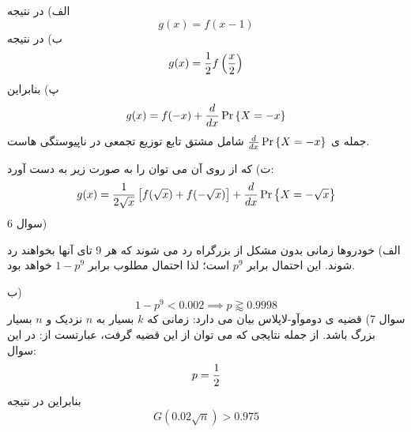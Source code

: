\documentclass[10pt,letterpaper]{article}
\begin{document}
الف)
در نتیجه
$$
g(x)=f(x-1)
$$
ب)
در نتیجه
$$
g(x)={1\over 2}f\left({x\over 2}\right)
$$
پ)
بنابراین
$$
g(x)=f(-x)+{d\over dx}\Pr\left\{X=-x\right\}
$$
جمله ی ${d\over dx}\Pr\left\{X=-x\right\}$ شامل مشتق تابع توزیع تجمعی در ناپیوستگی هاست.

ت)
که از روی آن می توان  را به صورت زیر به دست آورد:
$$
g(x)={1\over 2\sqrt x}\left[f(\sqrt x)+f(-\sqrt x)\right]+{d\over dx}\Pr\left\{X=-\sqrt x\right\}
$$
سوال 6)

الف) خودروها زمانی بدون مشکل از بزرگراه رد می شوند که هر 9 تای آنها بخواهند رد شوند. این احتمال برابر $p^9$ است؛ لذا احتمال مطلوب برابر $1-p^9$ خواهد بود.

ب) 
$$
1-p^9<0.002\implies p\gtrapprox 0.9998
$$
سوال 7) قضیه ی دوموآو-لاپلاس بیان می دارد:
زمانی که $k$ بسیار به $n$ نزدیک و $n$ بسیار بزرگ باشد. از جمله نتایجی که می توان از این قضیه گرفت، عبارتست از:
در این سوال:
$$
p={1\over 2}
$$
بنابراین
در نتیجه
$$
G\left({0.02\sqrt n}\right)>0.975
$$
\end{document}
